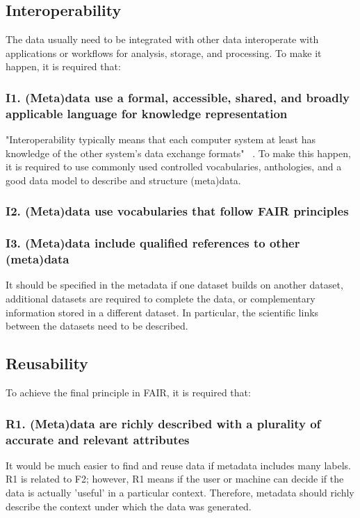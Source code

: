 \subsection*{Interoperability}
The data usually need to be integrated with other data interoperate with applications or workflows for analysis, storage, and processing. To make it happen, it is required that:


\subsubsection*{I1. (Meta)data use a formal, accessible, shared, and broadly applicable language for knowledge representation}

"Interoperability typically means that each computer system at least has knowledge of the other system's data exchange formats" ~\cite{FAIR_Principles}. To make this happen, it is required to use commonly used controlled vocabularies, anthologies, and a good data model to describe and structure (meta)data.
 
\subsubsection*{I2. (Meta)data use vocabularies that follow FAIR principles}


\subsubsection*{I3. (Meta)data include qualified references to other (meta)data}
It should be specified in the metadata if one dataset builds on another dataset, additional datasets are required to complete the data, or complementary information stored in a different dataset. In particular, the scientific links between the datasets need to be described.

\subsection*{Reusability}
To achieve the final principle in FAIR, it is required that:

\subsubsection*{R1. (Meta)data are richly described with a plurality of accurate and relevant attributes}
It would be much easier to find and reuse data if metadata includes many labels. R1 is related to F2; however, R1 means if the user or machine can decide if the data is actually 'useful' in a particular context. Therefore, metadata should richly describe the context under which the data was generated. 

